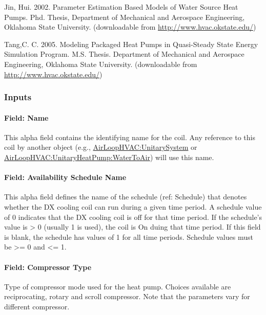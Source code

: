 Jin, Hui. 2002. Parameter Estimation Based Models of Water Source Heat Pumps. Phd. Thesis, Department of Mechanical and Aerospace Engineering, Oklahoma State University. (downloadable from \href{http://www.hvac.okstate.edu}{http://www.hvac.okstate.edu/})

Tang,C. C. 2005. Modeling Packaged Heat Pumps in Quasi-Steady State Energy Simulation Program. M.S. Thesis. Department of Mechanical and Aerospace Engineering, Oklahoma State University. (downloadable from \href{http://www.hvac.okstate.edu}{http://www.hvac.okstate.edu/})

\subsubsection{Inputs}\label{inputs-29}

\paragraph{Field: Name}\label{field-name-28}

This alpha field contains the identifying name for the coil. Any reference to this coil by another object (e.g., \hyperref[airloophvacunitarysystem]{AirLoopHVAC:UnitarySystem} or \hyperref[airloophvacunitaryheatpumpwatertoair]{AirLoopHVAC:UnitaryHeatPump:WaterToAir}) will use this name.

\paragraph{Field: Availability Schedule Name}\label{field-availability-schedule-name-16-006}

This alpha field defines the name of the schedule (ref: Schedule) that denotes whether the DX cooling coil can run during a given time period. A schedule value of 0 indicates that the DX cooling coil is off for that time period. If the schedule's value is \textgreater{} 0 (usually 1 is used), the coil is On duing that time period. If this field is blank, the schedule has values of 1 for all time periods. Schedule values must be \textgreater{}= 0 and \textless{}= 1.

\paragraph{Field: Compressor Type}\label{field-compressor-type}

Type of compressor mode used for the heat pump. Choices available are reciprocating, rotary and scroll compressor. Note that the parameters vary for different compressor.

